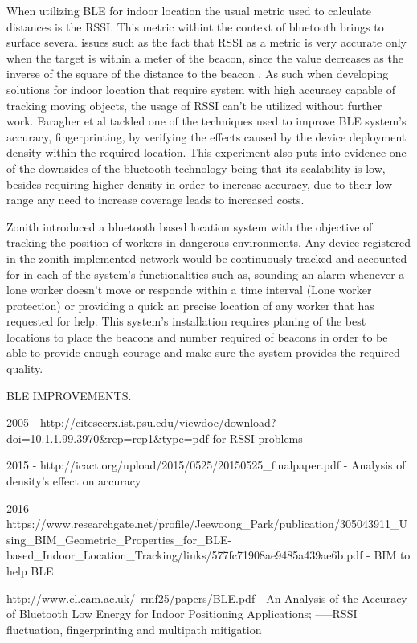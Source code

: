When utilizing BLE for indoor location the usual metric used to calculate distances is the RSSI. This metric withint the context of bluetooth brings to surface several issues such as the fact that RSSI as a metric is very accurate only when the target is within a meter of the beacon, since the value decreases as the inverse of the square of the distance to the beacon . As such when developing solutions for indoor location that require system with high accuracy capable of tracking moving objects, the usage of RSSI can't be utilized without further work. Faragher et al \cite{bleacc} tackled one of the techniques used to improve BLE system's accuracy, fingerprinting, by verifying the effects caused by the device deployment density within the required location. This experiment also puts into evidence one of the downsides of the bluetooth technology being that its scalability is low, besides requiring higher density in order to increase accuracy, due to their low range any need to increase coverage leads to increased costs.


Zonith \cite{zonith} introduced a bluetooth based location system with the objective of tracking the position of workers in dangerous environments. Any device registered in the zonith implemented network would be continuously tracked and accounted for in each of the system's functionalities such as, sounding an alarm whenever a lone worker doesn't move or responde within a time interval (Lone worker protection) or providing a quick an precise location of any worker that has requested for help. This system's installation requires planing of the best locations to place the beacons and number required of beacons in order to be able to provide enough courage and make sure the system provides the required quality.








BLE IMPROVEMENTS.

2005 - http://citeseerx.ist.psu.edu/viewdoc/download?doi=10.1.1.99.3970&rep=rep1&type=pdf for RSSI problems

2015 - http://icact.org/upload/2015/0525/20150525_finalpaper.pdf - Analysis of density's effect on accuracy

2016 - https://www.researchgate.net/profile/Jeewoong_Park/publication/305043911_Using_BIM_Geometric_Properties_for_BLE-based_Indoor_Location_Tracking/links/577fc71908ae9485a439ae6b.pdf -  BIM to help BLE

http://www.cl.cam.ac.uk/~rmf25/papers/BLE.pdf -  An Analysis of the Accuracy of Bluetooth Low Energy for Indoor Positioning Applications;
-----RSSI fluctuation, fingerprinting and multipath mitigation

